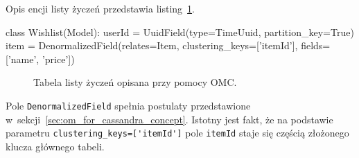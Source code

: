 Opis encji listy życzeń przedstawia listing~\ref{lst:omc_wishlist_definition}.

\begin{verbbox}
class Wishlist(Model):
    userId = UuidField(type=TimeUuid, partition_key=True)
    item = DenormalizedField(relates=Item, 
                             clustering_keys=['itemId'], 
                             fields=['name', 'price'])
\end{verbbox}

\begin{figure}[ht!]
	\centering
	\theverbbox
	\caption{Tabela listy życzeń opisana przy pomocy OMC.}
	\label{lst:omc_wishlist_definition}
\end{figure}

Pole \verb+DenormalizedField+ spełnia postulaty przedstawione w~sekcji~\ref{sec:om_for_cassandra_concept}. Istotny jest fakt, że na podstawie parametru \verb+clustering_keys=['itemId']+ pole \verb+itemId+ staje się częścią złożonego klucza głównego tabeli.
